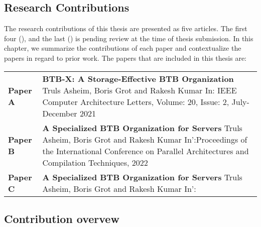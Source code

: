\documentclass[../main.tex]{subfiles}
\begin{document}
\ifx\chapincluded\undefined
  \begin{refsection}
 \fi

\chapter{Research Contributions}
\label{chap:rcontrib}

The research contributions of this thesis are presented as five articles. The first four (), and the last () is pending review at the time of thesis submission. In this chapter, we summarize the contributions of each paper and contextualize the papers in regard to prior work. The papers that are included in this thesis are:


\vspace*{0.8cm}

\noindent
\begin{tabular}{lp{}}
\textbf{Paper A} & \textbf{BTB-X: A Storage-Effective BTB Organization} \newline
                     Truls Asheim, Boris Grot and Rakesh Kumar \newline
                     In: IEEE Computer Architecture Letters, Volume: 20, Issue: 2, July-December 2021
                     \vspace*{0.3cm} \\
\textbf{Paper B} & \textbf{A Specialized BTB Organization for Servers} \newline
                     Truls Asheim, Boris Grot and Rakesh Kumar \newline
                     In':Proceedings of the International Conference on Parallel Architectures and Compilation Techniques, 2022
                     \vspace*{0.3cm} \\
\textbf{Paper C} & \textbf{A Specialized BTB Organization for Servers} \newline
                     Truls Asheim, Boris Grot and Rakesh Kumar \newline
                     In': 
                     \vspace*{0.3cm} \\

\end{tabular}


\section{Contribution overvew}


\end{refsection}
\end{document}
